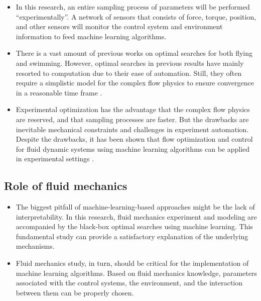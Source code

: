 \documentclass[12pt, a4paper]{article}
\providecommand{\tightlist}{%
  \setlength{\itemsep}{0pt}\setlength{\parskip}{0pt}}
\begin{document}
\begin{itemize}
\tightlist
\item
  In this research, an entire sampling process of parameters will be
  performed ``experimentally''. A network of sensors that consists of
  force, torque, position, and other sensors will monitor the control
  system and environment information to feed machine learning
  algorithms.
\item
  There is a vast amount of previous works on optimal searches for both
  flying and swimming. However, optimal searches in previous results
  have mainly resorted to computation due to their ease of automation.
  Still, they often require a simplistic model for the complex flow
  physics to ensure convergence in a reasonable time frame
  \citep{Martin2018}.
\item
  Experimental optimization has the advantage that the complex flow
  physics are reserved, and that sampling processes are faster. But the
  drawbacks are inevitable mechanical constraints and challenges in
  experiment automation. Despite the drawbacks, it has been shown that
  flow optimization and control for fluid dynamic systems using machine
  learning algorithms can be applied in experimental settings
  \citep[\citet{Martin2018},\citet{Ramananarivo2019}]{Strom2017}.
\end{itemize}

\hypertarget{role-of-fluid-mechanics-1}{%
\subsection{Role of fluid mechanics}\label{role-of-fluid-mechanics-1}}

\begin{itemize}
\tightlist
\item
  The biggest pitfall of machine-learning-based approaches might be the
  lack of interpretability. In this research, fluid mechanics experiment
  and modeling are accompanied by the black-box optimal searches using
  machine learning. This fundamental study can provide a satisfactory
  explanation of the underlying mechanisms.
\item
  Fluid mechanics study, in turn, should be critical for the
  implementation of machine learning algorithms. Based on fluid
  mechanics knowledge, parameters associated with the control systems,
  the environment, and the interaction between them can be properly
  chosen.
\end{itemize}

\end{document}
